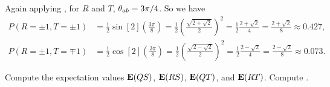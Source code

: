 \begin{solution}
	Again applying , for $R$ and $T$, $\theta_{ab} = 3\pi / 4$.  So we have
	\begin{align*}
		P(R=\pm1, T=\pm1) &= \frac{1}{2} \sin[2](\frac{3\pi}{8})
		= \frac{1}{2} \left( \frac{\sqrt{2 + \sqrt{2}}}{2} \right)^2
		= \frac{1}{2} \frac{2 + \sqrt{2}}{4}
		= \frac{2 + \sqrt{2}}{8}
		\approx 0.427, \\
		P(R=\pm1, T=\mp1) &= \frac{1}{2} \cos[2](\frac{3\pi}{8})
		= \frac{1}{2} \left( \frac{\sqrt{2 - \sqrt{2}}}{2} \right)^2
		= \frac{1}{2} \frac{2 - \sqrt{2}}{4}
		= \frac{2 - \sqrt{2}}{8}
		\approx 0.073.
	\end{align*}
	\vfix
\end{solution}



\begin{problem}
	Compute the expectation values $\vb{E}(QS)$, $\vb{E}(RS)$, $\vb{E}(QT)$, and $\vb{E}(RT)$.  Compute
	\beq
		.
	\eeq
	\vfix
\end{problem}


